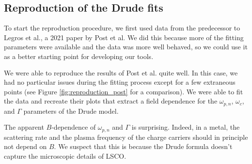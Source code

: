 \subsection{Reproduction of the Drude fits}
To start the reproduction procedure, we first used data from the predecessor to Legros et al., a 2021
paper by Post et al.\cite{post2021} We did this because more of the fitting parameters were available
and the data was more well behaved, so we could use it as a better starting point for developing our
tools.

We were able to reproduce the results of Post et al. quite well.  In this case, we had no particular
issues during the fitting process except for a few extraneous points (see Figure
\ref{fig:reproduction_post} for a comparison). We were able to fit the data
and recreate their plots that extract a field dependence for the $\omega_{p,n}$, $\omega_c$,
and $\Gamma$ parameters of the Drude model.

The apparent $B$-dependence of $\omega_{p,n}$ and $\Gamma$ is surprising.
Indeed, in a metal, the scattering rate and the plasma frequency of the charge carriers should in principle not depend on $B$. 
We suspect that this is because the Drude formula doesn't capture the microscopic details of LSCO.

